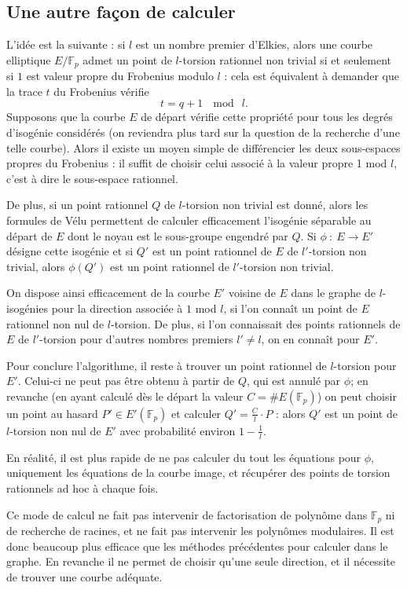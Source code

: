 \documentclass[11pt,a4paper]{article}
\newcommand{\F}{\mathbb{F}}
\newcommand{\vers}{\rightarrow}
\theoremstyle{definition}
\begin{document}
\subsection{Une autre façon de calculer}

L'idée est la suivante : si $l$ est un nombre premier d'Elkies, alors une courbe elliptique $E/\F_p$ admet un point de $l$-torsion rationnel non trivial si et seulement si $1$ est valeur propre du Frobenius modulo $l$ : cela est équivalent à demander que la trace $t$ du Frobenius vérifie
$$t = q+1 \ \mod\ l.$$
Supposons que la courbe $E$ de départ vérifie cette propriété pour tous les degrés d'isogénie considérés (on reviendra plus tard sur la question de la recherche d'une telle courbe). Alors il existe un moyen simple de différencier les deux sous-espaces propres du Frobenius : il suffit de choisir celui associé à la valeur propre 1 mod $l$, c'est à dire le sous-espace rationnel.

De plus, si un point rationnel $Q$ de $l$-torsion non trivial est donné, alors les formules de Vélu permettent de calculer efficacement l'isogénie séparable au départ de $E$ dont le noyau est le sous-groupe engendré par $Q$. Si $\phi\ :\ E\vers E'$ désigne cette isogénie et si $Q'$ est un point rationnel de $E$ de $l'$-torsion non trivial, alors $\phi(Q')$ est un point rationnel de $l'$-torsion non trivial.

On dispose ainsi efficacement de la courbe $E'$ voisine de $E$ dans le graphe de $l$-isogénies pour la direction associée à $1$ mod $l$, si l'on connaît un point de $E$ rationnel non nul de $l$-torsion. De plus, si l'on connaissait des points rationnels de $E$ de $l'$-torsion pour d'autres nombres premiers $l'\neq l$, on en connaît pour $E'$.

Pour conclure l'algorithme, il reste à trouver un point rationnel de $l$-torsion pour $E'$. Celui-ci ne peut pas être obtenu à partir de $Q$, qui est annulé par $\phi$; en revanche (en ayant calculé dès le départ la valeur $C=\#E(\F_p)$) on peut choisir un point au hasard $P'\in E'(\F_p)$ et calculer $Q'=\frac{C}{l}\cdot P$ : alors $Q'$ est un point de $l$-torsion non nul de $E'$ avec probabilité environ $1-\frac{1}{l}$.

En réalité, il est plus rapide de ne pas calculer du tout les équations pour $\phi$, uniquement les équations de la courbe image, et récupérer des points de torsion rationnels ad hoc à chaque fois.

Ce mode de calcul ne fait pas intervenir de factorisation de polynôme dans $\F_p$ ni de recherche de racines, et ne fait pas intervenir les polynômes modulaires. Il est donc beaucoup plus efficace que les méthodes précédentes pour calculer dans le graphe. En revanche il ne permet de choisir qu'une seule direction, et il nécessite de trouver une courbe adéquate.
\end{document}
